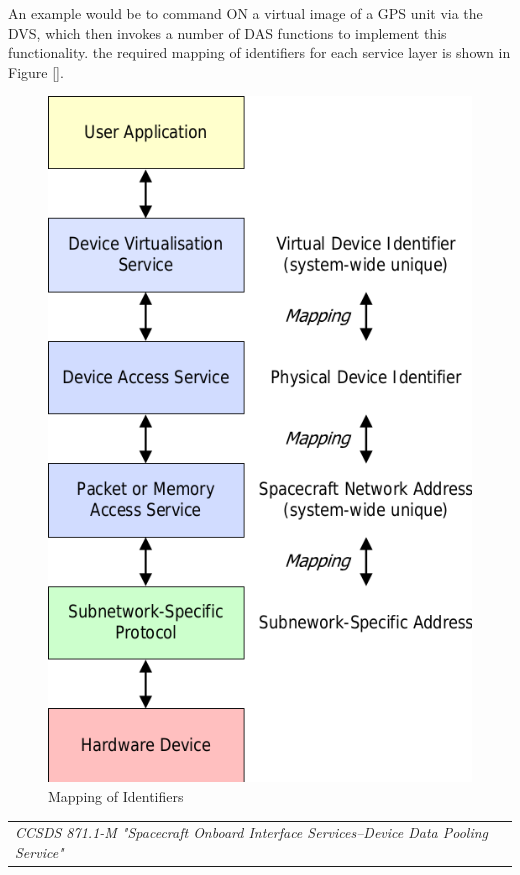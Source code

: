An example would be to command ON a virtual image of a GPS unit via the DVS, which then invokes a number of DAS functions to implement this functionality. the required mapping of identifiers for each service layer is shown in Figure \ref{}.

\begin{figure}[h]
\centering\includegraphics[scale=0.3]{fig/mapping_of_identifiers}
\caption{Mapping of Identifiers}
\label{fig:Mapping of Identifiers}
\end{figure}

\begin{tabular}{l}
\textit{CCSDS 871.1-M "Spacecraft Onboard Interface Services--Device Data Pooling Service" \cite{CCSDS 871.1-M}} 
\end{tabular}

